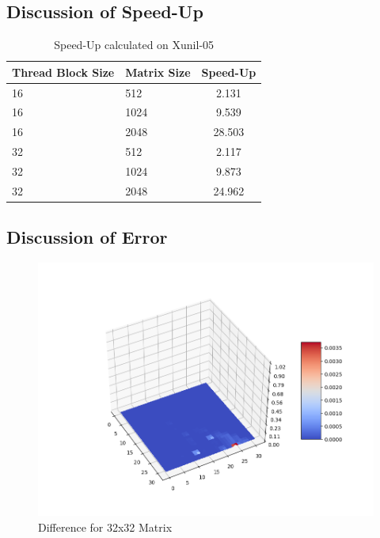 \documentclass[12pt]{article}
\begin{document}
\subsection{Discussion of Speed-Up}
\begin{table}[H]
\centering
\begin{tabular}{@{}|l|l|c|}
\hline
Thread Block Size & Matrix Size & Speed-Up \\ \hline
16 & 512 & 2.131  \\ \hline
16 & 1024 &  9.539 \\ \hline
16 & 2048 &  28.503 \\ \hline
32 & 512 & 2.117  \\ \hline
32 & 1024 & 9.873  \\ \hline
32 & 2048 & 24.962  \\ \hline
\end{tabular}
\caption{Speed-Up calculated on Xunil-05}
\end{table}

\subsection{Discussion of Error}

\begin{figure}[H]
    \centering
    \includegraphics[width=\textwidth]{imgs/32.png}
    \caption{Difference for 32x32 Matrix}
\end{figure}
\end{document}
